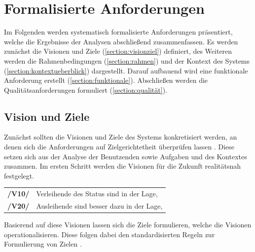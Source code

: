\section{Formalisierte Anforderungen}
\label{section:anforderung}

Im Folgenden werden systematisch formalisierte Anforderungen präsentiert, welche die Ergebnisse der Analysen abschließend zusammenfassen.
Es werden zunächst die Visionen und Ziele (\ref{section:visionziel}) definiert, des Weiteren werden
die Rahmenbedingungen (\ref{section:rahmen}) und der Kontext des Systems
(\ref{section:kontextueberblick}) dargestellt. Darauf aufbauend wird eine funktionale Anforderung
erstellt (\ref{section:funktionale}). Abschließen werden die Qualitätsanforderungen formuliert
(\ref{section:qualität}).


\subsection*{Vision und Ziele}
\label{section:visionziel}
Zunächst sollten die Visionen und Ziele des Systems konkretisiert werden, an denen sich die
Anforderungen auf Zielgerichtetheit überprüfen lassen \cite{balzert2009}. Diese setzen sich aus der
Analyse der Benutzenden sowie Aufgaben und des Kontextes zusammen. Im ersten Schritt werden die
Visionen für die Zukunft realitätsnah festgelegt.



\begin{center}
        \renewcommand{\arraystretch}{1.5}
        \begin{tabular}{p{}p{}}
                \hline
                \textbf{/V10/} & Verleihende des Status sind in der Lage,                                          \\
                \textbf{/V20/} & Ausleihende sind besser dazu in der Lage,                                         \\
                \hline
        \end{tabular}
\end{center}

Basierend auf diese Visionen lassen sich die Ziele formulieren, welche die Visionen
operationalisieren. Diese folgen dabei den standardisierten Regeln zur Formulierung von Zielen
\cite{pohl_requirements_2008}.


